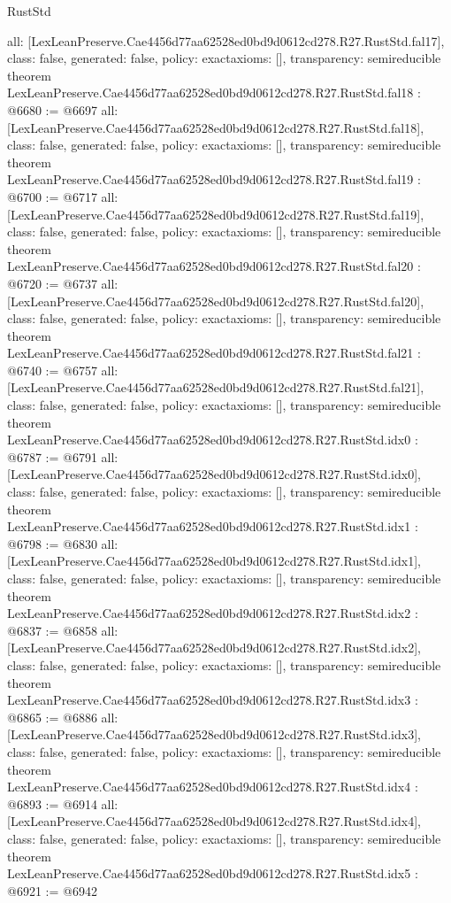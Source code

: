 \begin{lexlean}{RustStd}
\begin{coremodule}
{  all: [LexLeanPreserve.Cae4456d77aa62528ed0bd9d0612cd278.R27.RustStd.fal17],
  class: false,
  generated: false,
  policy: exact{axioms: []},
  transparency: semireducible
}
theorem LexLeanPreserve.Cae4456d77aa62528ed0bd9d0612cd278.R27.RustStd.fal18 : @6680 := @6697 {
  all: [LexLeanPreserve.Cae4456d77aa62528ed0bd9d0612cd278.R27.RustStd.fal18],
  class: false,
  generated: false,
  policy: exact{axioms: []},
  transparency: semireducible
}
theorem LexLeanPreserve.Cae4456d77aa62528ed0bd9d0612cd278.R27.RustStd.fal19 : @6700 := @6717 {
  all: [LexLeanPreserve.Cae4456d77aa62528ed0bd9d0612cd278.R27.RustStd.fal19],
  class: false,
  generated: false,
  policy: exact{axioms: []},
  transparency: semireducible
}
theorem LexLeanPreserve.Cae4456d77aa62528ed0bd9d0612cd278.R27.RustStd.fal20 : @6720 := @6737 {
  all: [LexLeanPreserve.Cae4456d77aa62528ed0bd9d0612cd278.R27.RustStd.fal20],
  class: false,
  generated: false,
  policy: exact{axioms: []},
  transparency: semireducible
}
theorem LexLeanPreserve.Cae4456d77aa62528ed0bd9d0612cd278.R27.RustStd.fal21 : @6740 := @6757 {
  all: [LexLeanPreserve.Cae4456d77aa62528ed0bd9d0612cd278.R27.RustStd.fal21],
  class: false,
  generated: false,
  policy: exact{axioms: []},
  transparency: semireducible
}
theorem LexLeanPreserve.Cae4456d77aa62528ed0bd9d0612cd278.R27.RustStd.idx0 : @6787 := @6791 {
  all: [LexLeanPreserve.Cae4456d77aa62528ed0bd9d0612cd278.R27.RustStd.idx0],
  class: false,
  generated: false,
  policy: exact{axioms: []},
  transparency: semireducible
}
theorem LexLeanPreserve.Cae4456d77aa62528ed0bd9d0612cd278.R27.RustStd.idx1 : @6798 := @6830 {
  all: [LexLeanPreserve.Cae4456d77aa62528ed0bd9d0612cd278.R27.RustStd.idx1],
  class: false,
  generated: false,
  policy: exact{axioms: []},
  transparency: semireducible
}
theorem LexLeanPreserve.Cae4456d77aa62528ed0bd9d0612cd278.R27.RustStd.idx2 : @6837 := @6858 {
  all: [LexLeanPreserve.Cae4456d77aa62528ed0bd9d0612cd278.R27.RustStd.idx2],
  class: false,
  generated: false,
  policy: exact{axioms: []},
  transparency: semireducible
}
theorem LexLeanPreserve.Cae4456d77aa62528ed0bd9d0612cd278.R27.RustStd.idx3 : @6865 := @6886 {
  all: [LexLeanPreserve.Cae4456d77aa62528ed0bd9d0612cd278.R27.RustStd.idx3],
  class: false,
  generated: false,
  policy: exact{axioms: []},
  transparency: semireducible
}
theorem LexLeanPreserve.Cae4456d77aa62528ed0bd9d0612cd278.R27.RustStd.idx4 : @6893 := @6914 {
  all: [LexLeanPreserve.Cae4456d77aa62528ed0bd9d0612cd278.R27.RustStd.idx4],
  class: false,
  generated: false,
  policy: exact{axioms: []},
  transparency: semireducible
}
theorem LexLeanPreserve.Cae4456d77aa62528ed0bd9d0612cd278.R27.RustStd.idx5 : @6921 := @6942 {
}
\end{coremodule}
\end{lexlean}
